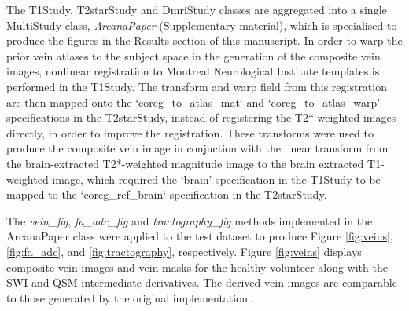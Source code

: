 \documentclass[smallextended]{svjour3}       %
\begin{document}
The T1Study, T2starStudy and DmriStudy classes are
aggregated into a single MultiStudy class,
\emph{ArcanaPaper} (Supplementary material), which is specialised to produce
the figures in the Results section of this manuscript. In order to warp the
prior vein atlases to the subject space in the generation of the composite vein images,
nonlinear registration to Montreal Neurological Institute templates
\citep{mni-cite} is performed in the T1Study. The transform and warp
field from this registration are then mapped onto the `coreg\_to\_atlas\_mat` and
`coreg\_to\_atlas\_warp' specifications in the T2starStudy, instead
of registering the T2*-weighted images directly, in order to improve the registration.
These transforms were used to produce the composite vein
image in conjuction with the linear transform from the brain-extracted T2*-weighted
magnitude image to the brain extracted T1-weighted image, which required the
`brain' specification in the T1Study to be mapped to the `coreg\_ref\_brain`
specification in the T2starStudy.

The \emph{vein\_fig}, \emph{fa\_adc\_fig} and \emph{tractography\_fig} methods
implemented in the ArcanaPaper class were applied to the test dataset to produce
Figure \ref{fig:veins}, \ref{fig:fa_adc}, and \ref{fig:tractography}, respectively.
Figure \ref{fig:veins} displays composite vein images and vein masks for the healthy
volunteer along with the SWI and QSM intermediate derivatives.
The derived vein images are comparable to those
generated by the original implementation \citep{ward_combining_2018}.
\end{document}
